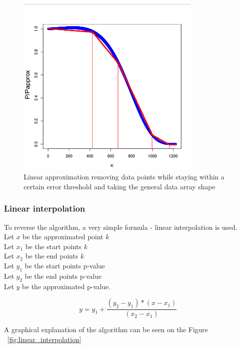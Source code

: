 \documentclass[12pt]{article}
\begin{document}
{\begin{figure}[H]
  \centering
  \includegraphics[width=0.8\textwidth]{linear_approximation}
  \caption{Linear approximation removing data points while staying within a certain error threshold and taking the general data array shape}
  \label{fig:linear_approximation}
\end{figure}

\subsubsection{Linear interpolation}
To reverse the algorithm, a very simple formula - linear interpolation is used.\\
Let $x$ be the approximated point $k$\\
Let $x_1$ be the start points $k$\\
Let $x_2$ be the end points $k$\\
Let $y_1$ be the start points p-value \\
Let $y_2$ be the end points p-value\\
Let $y$ be the approximated p-value.

\begin{equation}
  y = y_1 + \frac{(y_2 - y_1) * (x - x_1)}{(x_2 - x_1)}
\end{equation}

A graphical explanation of the algorithm can be seen on the Figure ~\ref{fig:linear_interpolation}

}
\end{document}
